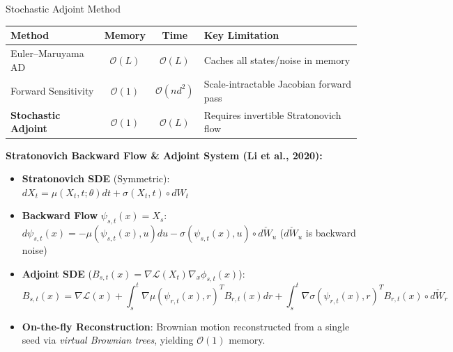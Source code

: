 \documentclass{beamer}
\begin{document}
\begin{frame}{Stochastic Adjoint Method}
    \begin{table}
        \centering
        \small
        \begin{tabular}{lccl}
            \hline
            \textbf{Method} & \textbf{Memory} & \textbf{Time} & \textbf{Key Limitation} \\ \hline
            Euler--Maruyama AD & $\mathcal{O}(L)$ & $\mathcal{O}(L)$ & Caches all states/noise in memory \\
            Forward Sensitivity & $\mathcal{O}(1)$ & $\mathcal{O}(nd^2)$ & Scale-intractable Jacobian forward pass \\
            \textbf{Stochastic Adjoint} & $\mathcal{O}(1)$ & $\mathcal{O}(L)$ & Requires invertible Stratonovich flow \\ \hline
        \end{tabular}
    \end{table}

    \vspace{0.2cm}
    \textbf{Stratonovich Backward Flow \& Adjoint System (Li et al., 2020):}
    \begin{itemize}
        \item \textbf{Stratonovich SDE} (Symmetric): \\
        $dX_t = \mu(X_t, t; \theta)dt + \sigma(X_t, t) \circ dW_t$
        \item \textbf{Backward Flow} $\psi_{s,t}(x) = X_s$: \\
        $d\psi_{s,t}(x) = -\mu(\psi_{s,t}(x), u)du - \sigma(\psi_{s,t}(x), u) \circ d\check{W}_u$ \quad ($d\check{W}_u$ is backward noise)
        \item \textbf{Adjoint SDE} ($B_{s,t}(x) = \nabla \mathcal{L}(X_t) \nabla_x \phi_{s,t}(x)$):
        \[ B_{s,t}(x) = \nabla \mathcal{L}(x) + \int_s^t \nabla \mu(\psi_{r,t}(x), r)^T B_{r,t}(x) dr + \int_s^t \nabla \sigma(\psi_{r,t}(x), r)^T B_{r,t}(x) \circ d\check{W}_r \]
        \item \textbf{On-the-fly Reconstruction}: Brownian motion reconstructed from a single seed via \textit{virtual Brownian trees}, yielding $\mathcal{O}(1)$ memory.
    \end{itemize}
\end{frame}
\end{document}
